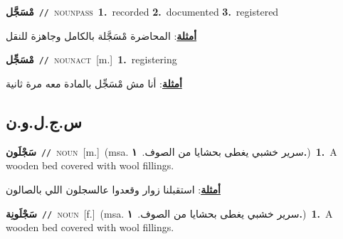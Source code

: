 \documentclass[10pt,a4paper,twoside]{article} %
\begin{document}
\begin{multicols}{2}
{\setlength\topsep{0pt}\textbf{\foreignlanguage{arabic}{مْسَجَّل}}\ {\color{gray}\texttt{//}\color{black}}\ \textsc{noun\textunderscore pass}\ \textbf{1.}~recorded  \textbf{2.}~documented  \textbf{3.}~registered\  \begin{flushright}\color{gray}\foreignlanguage{arabic}{\textbf{\underline{\foreignlanguage{arabic}{أمثلة}}}: المحاضرة مْسَجَّلة بالكامل وجاهزة للنقل}\end{flushright}\color{black}} \vspace{2mm}

{\setlength\topsep{0pt}\textbf{\foreignlanguage{arabic}{مْسَجِّل}}\ {\color{gray}\texttt{//}\color{black}}\ \textsc{noun\textunderscore act}\ [m.]\ \textbf{1.}~registering\  \begin{flushright}\color{gray}\foreignlanguage{arabic}{\textbf{\underline{\foreignlanguage{arabic}{أمثلة}}}: أنا مش مْسَجِّل بالمادة معه مرة ثانية}\end{flushright}\color{black}} \vspace{2mm}

\vspace{-3mm}
\subsection*{\color{blue}\foreignlanguage{arabic}{س.ج.ل.و.ن}\color{blue}{ (ntws)}} 

{\setlength\topsep{0pt}\textbf{\foreignlanguage{arabic}{سَجْلَون}}\ {\color{gray}\texttt{//}\color{black}}\ \textsc{noun}\ [m.]\ \color{gray}(msa. \foreignlanguage{arabic}{سرير خشبي يغطى بحشايا من الصوف.}~\foreignlanguage{arabic}{\textbf{١.}})\color{black}\ \textbf{1.}~A wooden bed covered with wool  fillings.\  \begin{flushright}\color{gray}\foreignlanguage{arabic}{\textbf{\underline{\foreignlanguage{arabic}{أمثلة}}}: استقبلنا زوار وقعدوا عالسجلون اللي بالصالون}\end{flushright}\color{black}} \vspace{2mm}

{\setlength\topsep{0pt}\textbf{\foreignlanguage{arabic}{سَجْلَونِة}}\ {\color{gray}\texttt{//}\color{black}}\ \textsc{noun}\ [f.]\ \color{gray}(msa. \foreignlanguage{arabic}{سرير خشبي يغطى بحشايا من الصوف.}~\foreignlanguage{arabic}{\textbf{١.}})\color{black}\ \textbf{1.}~A wooden bed covered with wool  fillings.\ } \vspace{2mm}


\end{multicols}
\end{document}
